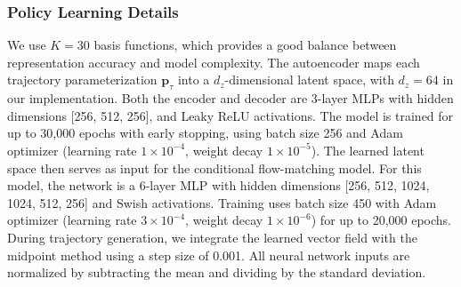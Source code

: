 \documentclass[letterpaper, 10 pt, conference]{ieeeconf}  %
\begin{document}
\subsubsection{Policy Learning Details}
We use $K=30$ basis functions, which provides a good balance between representation accuracy and model complexity.
The autoencoder maps each trajectory parameterization $\mathbf{p}_\tau$ into a $d_z$-dimensional latent space, with $d_z=64$ in our implementation. 
Both the encoder and decoder are 3-layer MLPs with hidden dimensions [256, 512, 256], and Leaky ReLU activations. 
The model is trained for up to 30,000 epochs with early stopping, using batch size 256 and Adam optimizer (learning rate $1\times 10^{-4}$, weight decay $1\times 10^{-5}$). 
The learned latent space then serves as input for the conditional flow-matching model. 
For this model, the network is a 6-layer MLP with hidden dimensions [256, 512, 1024, 1024, 512, 256] and Swish activations. 
Training uses batch size 450 with Adam optimizer (learning rate $3\times 10^{-4}$, weight decay $1\times 10^{-6}$) for up to 20,000 epochs. 
During trajectory generation, we integrate the learned vector field with the midpoint method using a step size of 0.001. 
All neural network inputs are normalized by subtracting the mean and dividing by the standard deviation. 


\end{document}
